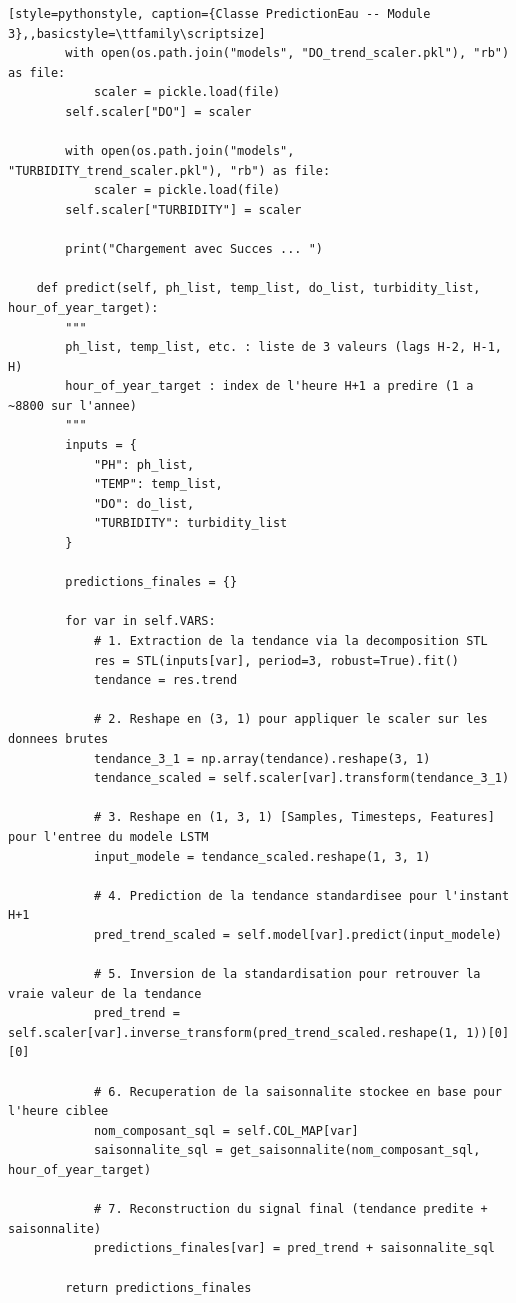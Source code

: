 \documentclass[a4paper,12pt, oneside]{article}
\begin{document}
\begin{lstlisting}[style=pythonstyle, caption={Classe PredictionEau -- Module 3},,basicstyle=\ttfamily\scriptsize]
        with open(os.path.join("models", "DO_trend_scaler.pkl"), "rb") as file:
            scaler = pickle.load(file)
        self.scaler["DO"] = scaler

        with open(os.path.join("models", "TURBIDITY_trend_scaler.pkl"), "rb") as file:
            scaler = pickle.load(file)
        self.scaler["TURBIDITY"] = scaler

        print("Chargement avec Succes ... ")

    def predict(self, ph_list, temp_list, do_list, turbidity_list, hour_of_year_target):
        """
        ph_list, temp_list, etc. : liste de 3 valeurs (lags H-2, H-1, H)
        hour_of_year_target : index de l'heure H+1 a predire (1 a ~8800 sur l'annee)
        """
        inputs = {
            "PH": ph_list,
            "TEMP": temp_list,
            "DO": do_list,
            "TURBIDITY": turbidity_list
        }

        predictions_finales = {}

        for var in self.VARS:
            # 1. Extraction de la tendance via la decomposition STL
            res = STL(inputs[var], period=3, robust=True).fit()
            tendance = res.trend

            # 2. Reshape en (3, 1) pour appliquer le scaler sur les donnees brutes
            tendance_3_1 = np.array(tendance).reshape(3, 1)
            tendance_scaled = self.scaler[var].transform(tendance_3_1)

            # 3. Reshape en (1, 3, 1) [Samples, Timesteps, Features] pour l'entree du modele LSTM
            input_modele = tendance_scaled.reshape(1, 3, 1)

            # 4. Prediction de la tendance standardisee pour l'instant H+1
            pred_trend_scaled = self.model[var].predict(input_modele)

            # 5. Inversion de la standardisation pour retrouver la vraie valeur de la tendance
            pred_trend = self.scaler[var].inverse_transform(pred_trend_scaled.reshape(1, 1))[0][0]

            # 6. Recuperation de la saisonnalite stockee en base pour l'heure ciblee
            nom_composant_sql = self.COL_MAP[var]
            saisonnalite_sql = get_saisonnalite(nom_composant_sql, hour_of_year_target)

            # 7. Reconstruction du signal final (tendance predite + saisonnalite)
            predictions_finales[var] = pred_trend + saisonnalite_sql

        return predictions_finales
\end{lstlisting}
\end{document}
